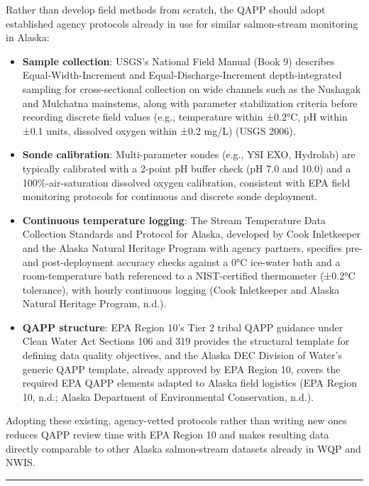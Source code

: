 \documentclass[
  letterpaper,
]{scrbook}
\providecommand{\tightlist}{%
  \setlength{\itemsep}{0pt}\setlength{\parskip}{0pt}}\usepackage{longtable,booktabs,array}
\begin{document}
Rather than develop field methods from scratch, the QAPP should adopt
established agency protocols already in use for similar salmon-stream
monitoring in Alaska:

\begin{itemize}
\tightlist
\item
  \textbf{Sample collection}: USGS's National Field Manual (Book 9)
  describes Equal-Width-Increment and Equal-Discharge-Increment
  depth-integrated sampling for cross-sectional collection on wide
  channels such as the Nushagak and Mulchatna mainstems, along with
  parameter stabilization criteria before recording discrete field
  values (e.g., temperature within ±0.2°C, pH within ±0.1 units,
  dissolved oxygen within ±0.2 mg/L) (USGS 2006).
\item
  \textbf{Sonde calibration}: Multi-parameter sondes (e.g., YSI EXO,
  Hydrolab) are typically calibrated with a 2-point pH buffer check (pH
  7.0 and 10.0) and a 100\%-air-saturation dissolved oxygen calibration,
  consistent with EPA field monitoring protocols for continuous and
  discrete sonde deployment.
\item
  \textbf{Continuous temperature logging}: The Stream Temperature Data
  Collection Standards and Protocol for Alaska, developed by Cook
  Inletkeeper and the Alaska Natural Heritage Program with agency
  partners, specifies pre- and post-deployment accuracy checks against a
  0°C ice-water bath and a room-temperature bath referenced to a
  NIST-certified thermometer (±0.2°C tolerance), with hourly continuous
  logging (Cook Inletkeeper and Alaska Natural Heritage Program, n.d.).
\item
  \textbf{QAPP structure}: EPA Region 10's Tier 2 tribal QAPP guidance
  under Clean Water Act Sections 106 and 319 provides the structural
  template for defining data quality objectives, and the Alaska DEC
  Division of Water's generic QAPP template, already approved by EPA
  Region 10, covers the required EPA QAPP elements adapted to Alaska
  field logistics (EPA Region 10, n.d.; Alaska Department of
  Environmental Conservation, n.d.).
\end{itemize}

Adopting these existing, agency-vetted protocols rather than writing new
ones reduces QAPP review time with EPA Region 10 and makes resulting
data directly comparable to other Alaska salmon-stream datasets already
in WQP and NWIS.

\begin{center}\rule{0.5\linewidth}{0.5pt}\end{center}
\end{document}
